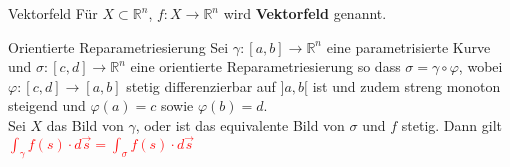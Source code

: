 \begin{Definition}{Vektorfeld}{}
	Für $X\subset \mathbb{R}^n$, $f:X\rightarrow \mathbb{R}^n$ wird \textbf{Vektorfeld} genannt. 
\end{Definition}

\begin{Satz}{Orientierte Reparametriesierung}{}
	Sei $\gamma:[a,b] \rightarrow \mathbb{R}^n$ eine parametrisierte Kurve und $\sigma:[c,d] \rightarrow \mathbb{R}^n$ eine orientierte Reparametriesierung
	so dass $\sigma =\gamma \circ \varphi$, wobei 
	$\varphi : [c,d] \rightarrow [a,b]$ stetig differenzierbar auf $
	]a,b[$ ist und zudem streng monoton steigend und $\varphi(a) = c$ sowie $\varphi(b)=d$.\\

	Sei $X$ das Bild von $\gamma$, oder ist das equivalente Bild von $\sigma$ und $f$ stetig.
	Dann gilt \textcolor{red}{$\int_{\gamma}f(s)\cdot d\vec{s} = \int_{\sigma}f(s)\cdot d\vec{s}$}
\end{Satz}
